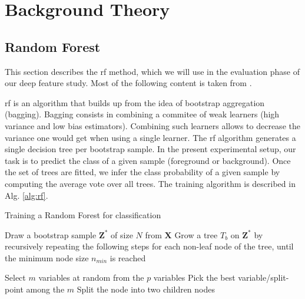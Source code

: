 \section{Background Theory}

\subsection{Random Forest}
\label{sec:rf}
This section describes the \gls{rf} method, which we will use in the evaluation phase of our deep feature study.
Most of the following content is taken from \cite{hastie09}.

\gls{rf} is an algorithm that builds up from the idea of bootstrap aggregation (bagging).
Bagging consists in combining a commitee of weak learners (high variance and low bias estimators).
Combining such learners allows to decrease the variance one would get when using a single learner.
The \gls{rf} algorithm generates a single decision tree per bootstrap sample.
In the present experimental setup, our task is to predict the class of a given sample (foreground or background).
Once the set of trees are fitted, we infer the class probability of a given sample by computing the average vote over all trees.
The training algorithm is described in Alg. \ref{alg:rf}.

\begin{algorithm}[H]
  \label{alg:rf}
 \caption{Training a Random Forest for classification}
 \begin{algorithmic}[1]
        \State Draw a bootstrap sample $\bm{Z}^{*}$ of size $N$ from $\bm{X}$
        \State Grow a tree $T_{b}$ on $\bm{Z}^{*}$ by recursively repeating the following steps for each non-leaf node of the tree, until the minimum node size $n_{min}$ is reached
        \begin{algsubstates}
                \State Select $m$ variables at random from the $p$ variables
                \State Pick the best variable/split-point among the $m$
                \State Split the node into two children nodes
            \end{algsubstates}
    \EndFor
  \end{algorithmic}
\end{algorithm}


